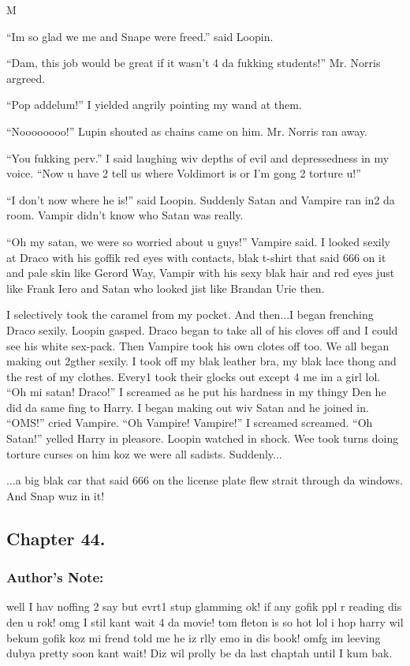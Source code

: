 M\documentclass{article}
\begin{document}
“Im so glad we me and Snape were freed.” said Loopin.

“Dam, this job would be great if it wasn’t 4 da fukking students!” Mr. Norris argreed.

“Pop addelum!” I yielded angrily pointing my wand at them.

“Noooooooo!” Lupin shouted as chains came on him. Mr. Norris ran away.

“You fukking perv.” I said laughing wiv depths of evil and depressedness in my voice. “Now u have 2 tell us where Voldimort is or I’m gong 2 torture u!”

“I don’t now where he is!” said Loopin. Suddenly Satan and Vampire ran in2 da room. Vampir didn’t know who Satan was really.

“Oh my satan, we were so worried about u guys!” Vampire said. I looked sexily at Draco with his goffik red eyes with contacts, blak t-shirt that said 666 on it and pale skin like Gerord Way, Vampir with his sexy blak hair and red eyes just like Frank Iero and Satan who looked jist like Brandan Urie then.

I selectively took the caramel from my pocket. And then...I began frenching Draco sexily. Loopin gasped. Draco began to take all of his cloves off and I could see his white sex-pack. Then Vampire took his own clotes off too. We all began making out 2gther sexily. I took off my blak leather bra, my blak lace thong and the rest of my clothes. Every1 took their glocks out except 4 me im a girl lol. “Oh mi satan! Draco!” I screamed as he put his hardness in my thingy Den he did da same fing to Harry. I began making out wiv Satan and he joined in. “OMS!” cried Vampire. “Oh Vampire! Vampire!” I screamed screamed. “Oh Satan!” yelled Harry in pleasore. Loopin watched in shock. Wee took turns doing torture curses on him koz we were all sadists. Suddenly...

...a big blak car that said 666 on the license plate flew strait through da windows. And Snap wuz in it!

\clearpage\nolinenumbers
\subsection*{Chapter 44.}

\subsubsection*{Author's Note:} well I hav noffing 2 say but evrt1 stup glamming ok! if any gofik ppl r reading dis den u rok! omg I stil kant wait 4 da movie! tom fleton is so hot lol i hop harry wil bekum gofik koz mi frend told me he iz rlly emo in dis book! omfg im leeving dubya pretty soon kant wait! Diz wil prolly be da last chaptah until I kum bak.
\end{document}
